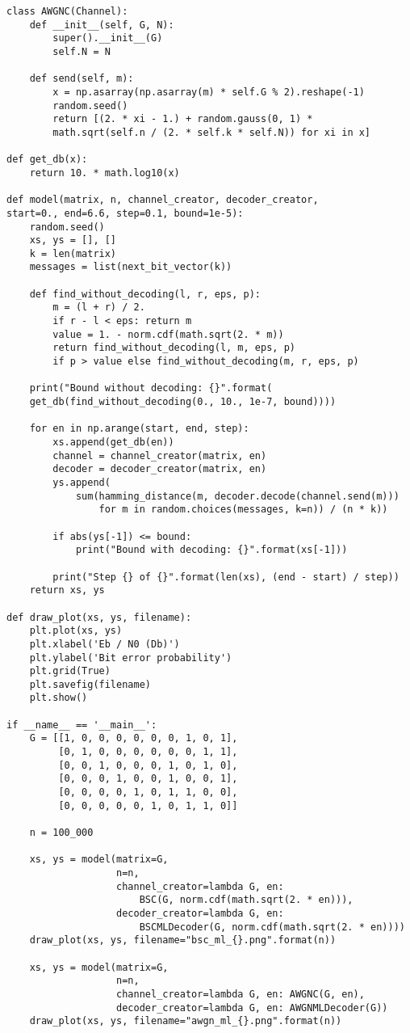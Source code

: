 \documentclass{article}
\begin{document}
\begin{lstlisting}[frame=single]
class AWGNC(Channel):
    def __init__(self, G, N):
        super().__init__(G)
        self.N = N

    def send(self, m):
        x = np.asarray(np.asarray(m) * self.G % 2).reshape(-1)
        random.seed()
        return [(2. * xi - 1.) + random.gauss(0, 1) *
        math.sqrt(self.n / (2. * self.k * self.N)) for xi in x]

def get_db(x):
    return 10. * math.log10(x)

def model(matrix, n, channel_creator, decoder_creator,
start=0., end=6.6, step=0.1, bound=1e-5):
    random.seed()
    xs, ys = [], []
    k = len(matrix)
    messages = list(next_bit_vector(k))

    def find_without_decoding(l, r, eps, p):
        m = (l + r) / 2.
        if r - l < eps: return m
        value = 1. - norm.cdf(math.sqrt(2. * m))
        return find_without_decoding(l, m, eps, p) 
        if p > value else find_without_decoding(m, r, eps, p)

    print("Bound without decoding: {}".format(
    get_db(find_without_decoding(0., 10., 1e-7, bound))))

    for en in np.arange(start, end, step):
        xs.append(get_db(en))
        channel = channel_creator(matrix, en)
        decoder = decoder_creator(matrix, en)
        ys.append(
            sum(hamming_distance(m, decoder.decode(channel.send(m)))
                for m in random.choices(messages, k=n)) / (n * k))

        if abs(ys[-1]) <= bound:
            print("Bound with decoding: {}".format(xs[-1]))

        print("Step {} of {}".format(len(xs), (end - start) / step))
    return xs, ys

def draw_plot(xs, ys, filename):
    plt.plot(xs, ys)
    plt.xlabel('Eb / N0 (Db)')
    plt.ylabel('Bit error probability')
    plt.grid(True)
    plt.savefig(filename)
    plt.show()

if __name__ == '__main__':
    G = [[1, 0, 0, 0, 0, 0, 0, 1, 0, 1],
         [0, 1, 0, 0, 0, 0, 0, 0, 1, 1],
         [0, 0, 1, 0, 0, 0, 1, 0, 1, 0],
         [0, 0, 0, 1, 0, 0, 1, 0, 0, 1],
         [0, 0, 0, 0, 1, 0, 1, 1, 0, 0],
         [0, 0, 0, 0, 0, 1, 0, 1, 1, 0]]

    n = 100_000

    xs, ys = model(matrix=G,
                   n=n,
                   channel_creator=lambda G, en: 
                       BSC(G, norm.cdf(math.sqrt(2. * en))),
                   decoder_creator=lambda G, en: 
                       BSCMLDecoder(G, norm.cdf(math.sqrt(2. * en))))
    draw_plot(xs, ys, filename="bsc_ml_{}.png".format(n))

    xs, ys = model(matrix=G,
                   n=n,
                   channel_creator=lambda G, en: AWGNC(G, en),
                   decoder_creator=lambda G, en: AWGNMLDecoder(G))
    draw_plot(xs, ys, filename="awgn_ml_{}.png".format(n))
\end{lstlisting}
\end{document}
